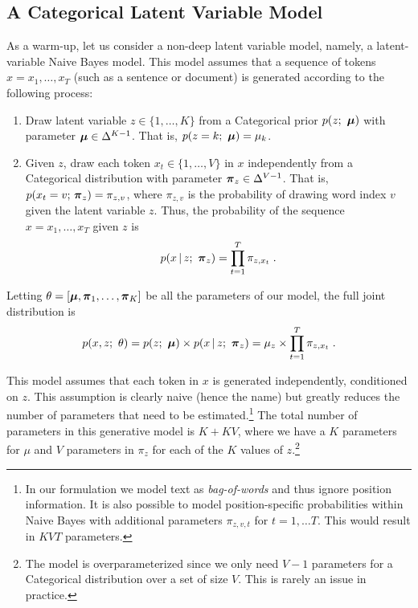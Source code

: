 \documentclass{article}
\begin{document}

\subsection{A Categorical Latent Variable Model}\label{naivebayes}
\label{sec:catlatmodel}
As a warm-up, let us consider a non-deep latent variable model, namely, a latent-variable Naive Bayes model.
This model assumes that a sequence of tokens $x = x_1, \ldots, x_T$ (such as a sentence or document) is generated according to the following process:

\begin{enumerate}
\item Draw latent variable $z \in \{1, \ldots, K\}$ from a Categorical prior $p(z ;\ \boldsymbol{\mu})$ with parameter $\boldsymbol{\mu} \in \Delta^{K-1}$. That is,
$p(z = k ;\ \boldsymbol{\mu}) = \mu_k$.
\item Given $z$, draw each token $x_t \in \{1, \dots, V\}$ in $x$ independently from a Categorical distribution with parameter $\boldsymbol{\pi}_{z} \in \Delta^{V-1}$. That is, $p(x_t = v ; \, \boldsymbol{\pi}_{z}) = \pi_{z, v}$,
where $\pi_{z, v}$ is the probability of drawing word index $v$ given the latent variable $z$.
Thus, the probability of the sequence $x = x_1, \dots, x_T$ given $z$ is
\[ p(x \,|\, z ; \ \boldsymbol{\pi}_{z}) = \prod_{t=1}^T \pi_{z, x_t} \; . \]
\end{enumerate}

Letting $\theta = [\boldsymbol{\mu}, \boldsymbol{\pi}_{1}, \ldots, \boldsymbol{\pi}_K]$ be all the parameters of our model, the full joint distribution is
\begin{align} \label{eq:nb}
 p(x, z ; \ \theta) = p(z;\ \boldsymbol{\mu}) \times p(x \,|\, z; \ \boldsymbol{\pi}_{z}) = \mu_{z} \times  \prod_{t=1}^T \pi_{z, x_t} \; .
 \end{align}

This model assumes that each token in $x$ is generated independently,
conditioned on $z$. This assumption is clearly naive (hence the name) but greatly reduces the number
of parameters that need to be estimated.\footnote{In our formulation we model text as \emph{bag-of-words} and thus ignore position information. It is also possible to model position-specific probabilities within Naive Bayes with additional parameters $\pi_{z,v,t}$ for $t = 1, \dots T$. This would result in $KVT$ parameters.} The total number of parameters in this generative model is $K + KV$, where we have a $K$ parameters for $\mu$ and $V$ parameters in $\pi_z$ for each of the $K$ values of $z$.\footnote{The model is overparameterized since we only need $V-1$ parameters for a Categorical distribution over a set of size $V$. This is rarely an issue in practice.} 
\end{document}
